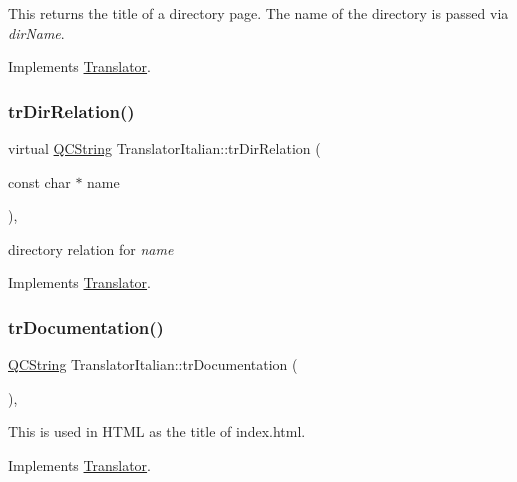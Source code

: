 This returns the title of a directory page. The name of the directory is passed via {\itshape dir\+Name}. 

Implements \mbox{\hyperlink{class_translator}{Translator}}.

\mbox{\label{class_translator_italian_a9a38c71fc11707e3095cf33089637526}} 
\subsubsection{\texorpdfstring{trDirRelation()}{trDirRelation()}}
{\footnotesize\ttfamily virtual \mbox{\hyperlink{class_q_c_string}{Q\+C\+String}} Translator\+Italian\+::tr\+Dir\+Relation (\begin{DoxyParamCaption}\item[{const char $\ast$}]{name }\end{DoxyParamCaption})\hspace{0.3cm}{\ttfamily [inline]}, {\ttfamily [virtual]}}

directory relation for {\itshape name} 

Implements \mbox{\hyperlink{class_translator}{Translator}}.

\mbox{\label{class_translator_italian_a0859d9fbdb1e3aff98d59224e0c641da}} 
\subsubsection{\texorpdfstring{trDocumentation()}{trDocumentation()}}
{\footnotesize\ttfamily \mbox{\hyperlink{class_q_c_string}{Q\+C\+String}} Translator\+Italian\+::tr\+Documentation (\begin{DoxyParamCaption}{ }\end{DoxyParamCaption})\hspace{0.3cm}{\ttfamily [inline]}, {\ttfamily [virtual]}}

This is used in H\+T\+ML as the title of index.\+html. 

Implements \mbox{\hyperlink{class_translator}{Translator}}.

\mbox{\label{class_translator_italian_a937d1073caa1dfcc87dd89e1eaff865b}} 

